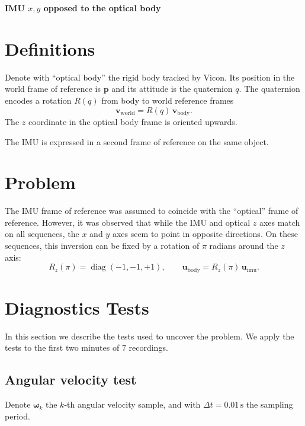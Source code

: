 \documentclass[11pt]{article}
\begin{document}
\begin{center}
  {\Large\bfseries IMU $x,y$ opposed to the optical body}
\end{center}
\smallskip

\section{Definitions}
Denote with ``optical body'' the rigid body tracked by Vicon.
Its position in the world frame of reference is $\mathbf{p}$ and its attitude is the quaternion
$q$. The quaternion encodes a rotation $R(q)$ from body to world reference frames
\begin{equation}
  \mathbf{v}_{\mathrm{world}} = R(q)\,\mathbf{v}_{\mathrm{body}} .
  \label{eq:body}
\end{equation}
The $z$ coordinate in the optical body frame is oriented upwards.

The IMU is expressed in a second frame of reference on the same object.

\section{Problem}
The IMU frame of reference was assumed to coincide with the ``optical'' frame of reference.
However, it was observed that while the IMU and optical $z$ axes match on all sequences, the $x$ and
$y$ axes seem to point in opposite directions. On these sequences, this inversion can be fixed by a
rotation of $\pi$ radians around the $z$ axis:
\begin{equation}
  R_z(\pi) = \operatorname{diag}(-1,-1,+1),
  \qquad
  \mathbf{u}_{\mathrm{body}} = R_z(\pi)\,\mathbf{u}_{\mathrm{imu}} .
  \label{eq:rz}
\end{equation}



\section{Diagnostics Tests}
In this section we describe the tests used to uncover the problem.
We apply the tests to the first two minutes of $7$ recordings.


\subsection{Angular velocity test}
Denote $\boldsymbol{\omega}_k$ the $k$-th angular velocity sample, and with
$\Delta t = 0.01\,\mathrm{s}$ the sampling period.
\end{document}
